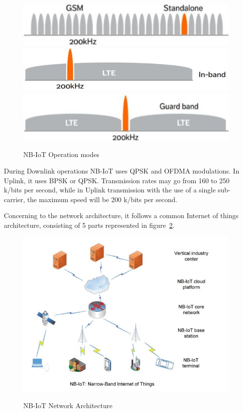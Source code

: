 \begin{figure}[htbp]
  \centering
    {\includegraphics[width=0.33\linewidth]{Chapters/Figures/NB-Stand-Alone.JPG}}%
    {\includegraphics[width=0.33\linewidth]{Chapters/Figures/NB-In-Band.JPG}}%
    {\includegraphics[width=0.33\linewidth]{Chapters/Figures/NB-Guard-Band.JPG}}%
  \caption{NB-IoT Operation modes~\cite{Ericson}}
  \label{fig:NBfig3subfig}
\end{figure}



During Downlink operations NB-IoT uses QPSK and OFDMA modulations. In Uplink, it uses BPSK or QPSK. Transmission rates may go from 160 to 250 k/bits per second, while in Uplink transmission with the use of a single sub-carrier, the maximum speed will be 200 k/bits per second.

Concerning to the network architecture, it follows a common Internet of things architecture, consisting  of 5 parts represented in figure~\ref{fig:NB_Network}.
\begin{figure}[htbp]
  \centering
  
    {\includegraphics[height=3 in,width=0.75\linewidth]{Chapters/Figures/NB-Network.JPG}}%
 
  \caption{NB-IoT Network Architecture~\cite{Chen2017}}
  \label{fig:NB_Network}
\end{figure}

